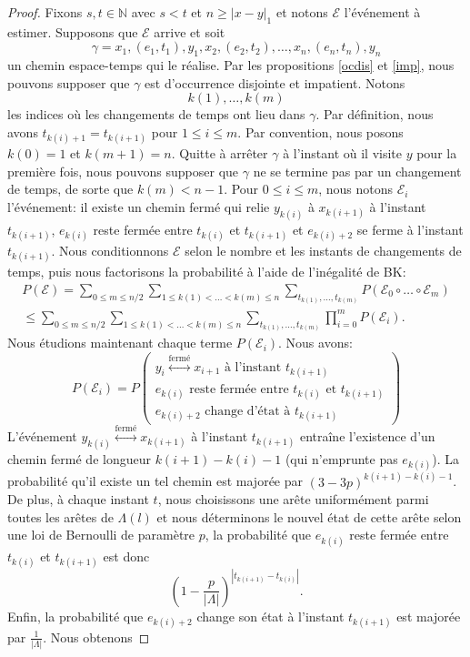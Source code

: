 \documentclass[titlepage,a4paper,12pt]{article}
\newcounter{d}
\newcounter{t}
\newcounter{p}
\newcounter{c}
\newcounter{a}
\newcounter{l}
\begin{document}
\begin{proof}
Fixons $s,t\in \mathbb{N}$ avec $s< t$ et $n\geqslant |x-y|_1$ et notons $\mathcal{E}$ l'événement à estimer. Supposons que $\mathcal{E}$ arrive et soit 
$$\gamma= x_1,(e_1,t_1), y_1, x_2,(e_2,t_2),\dots,x_n,(e_n,t_n),y_n$$ un chemin espace-temps qui le réalise. Par les propositions \ref{ocdis} et \ref{imp}, nous pouvons supposer que $\gamma$ est d'occurrence disjointe et impatient. Notons $$k(1),\dots,k(m)$$ les indices où les changements de temps ont lieu dans $\gamma$. Par définition, nous avons 
$t_{k(i)+1} = t_{k(i+1)}$ pour $1\leqslant i \leqslant m$. Par convention, nous posons $k(0) = 1$ et $k(m+1)=n$. Quitte à arrêter $\gamma$ à l'instant où il visite $y$ pour la première fois, nous pouvons supposer que $\gamma$ ne se termine pas par un changement de temps, de sorte que $k(m)< n-1$. Pour $0\leqslant i \leqslant m$, nous notons $\mathcal{E}_i$ l'événement: il existe un chemin fermé qui relie $y_{k(i)}$ à $x_{k(i+1)}$  à l'instant $t_{k(i+1)}$, $e_{k(i)}$ reste fermée entre $t_{k(i)}$ et $t_{k(i+1)}$ et $e_{k(i)+2}$ se ferme à l'instant $t_{k(i+1)}$. Nous conditionnons $\mathcal{E}$ selon le nombre et les instants de changements de temps, puis nous factorisons la probabilité à l'aide de l'inégalité de BK:
\begin{multline*}
P(\mathcal{E})
= \sum_{0\leqslant m \leqslant n/2}\sum_{1\leqslant k(1)<\dots<k(m)\leqslant n}\sum_{t_{k(1)},\dots,t_{k(m)}}P(\mathcal{E}_0\circ\dots\circ \mathcal{E}_m)\\
\leqslant \sum_{0\leqslant m \leqslant n/2}\sum_{1\leqslant k(1)<\dots<k(m)\leqslant n}\sum_{t_{k(1)},\dots,t_{k(m)}} \prod_{i=0}^mP(\mathcal{E}_i).
\end{multline*}
Nous étudions maintenant chaque terme $P(\mathcal{E}_i)$. Nous avons:
$$
P(\mathcal{E}_i) = P\left(\begin{array}{c}
y_i\overset{\text{fermé}}{\longleftrightarrow} x_{i+1}\text{ à l'instant }t_{k(i+1)}\\
e_{k(i)} \text{ reste fermée entre } t_{k(i)} \text{ et } t_{k(i+1)}\\
e_{k(i)+2} \text{ change d'état à }t_{k(i+1)}
\end{array}\right)
$$
L'événement $y_{k(i)}\overset{\text{fermé}}{\longleftrightarrow} x_{k(i+1)}$ à l'instant $t_{k(i+1)}$ entraîne l'existence d'un chemin fermé de longueur $k(i+1)-k(i)-1$ (qui n'emprunte pas $e_{k(i)}$). La probabilité qu'il existe un tel chemin est majorée par $(3-3p)^{k(i+1)-k(i)-1}$.
De plus, à chaque instant $t$, nous choisissons une arête uniformément parmi toutes les arêtes de $\Lambda(l)$ et nous déterminons le nouvel état de cette arête selon une loi de Bernoulli  de paramètre $p$, la probabilité que $e_{k(i)}$ reste fermée entre $t_{k(i)}$ et $t_{k(i+1)}$ est donc $$\left(1-\frac{p}{|\Lambda|}\right)^{|t_{k(i+1)}-t_{k(i)}|}.$$ Enfin, la probabilité que $e_{k(i)+2}$ change son état à l'instant $t_{k(i+1)}$ est majorée par $\frac{1}{|\Lambda|}$. Nous obtenons

\end{proof}
\end{document}
